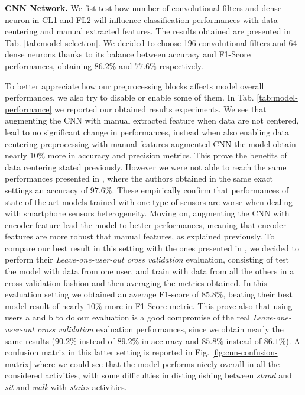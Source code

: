 \textbf{CNN Network.} We fist test how number of convolutional filters and dense neuron in CL1 and FL2 will influence classification performances with data centering and manual extracted features. The results obtained are presented in Tab. \ref{tab:model-selection}. We decided to choose 196 convolutional filters and 64 dense neurons thanks to its balance between accuracy and F1-Score performances, obtaining $86.2\%$ and $77.6\%$ respectively. 

To better appreciate how our preprocessing blocks affects model overall performances, we also try to disable or enable some of them. In Tab. \ref{tab:model-performance} we reported our obtained results experiments. We see that augmenting the CNN with manual extracted feature when data are not centered, lead to no significant change in performances, instead when also enabling data centering preprocessing with manual features augmented CNN the model obtain nearly $10\%$ more in accuracy and precision metrics. This prove the benefits of data centering stated previously. However we were not able to reach the same performances presented in \cite{ignatov2018real}, where the authors obtained in the same exact settings an accuracy of $97.6\%$. These empirically confirm that performances of state-of-the-art models trained with one type of sensors are worse when dealing with smartphone sensors heterogeneity. Moving on, augmenting the CNN with encoder feature lead the model to better performances, meaning that encoder features are more robust that manual features, as explained previously. To compare our best result in this setting with the ones presented in \cite{stisen2015smart}, we decided to perform their \textit{Leave-one-user-out cross validation} evaluation, consisting of test the model with data from one user, and train with data from all the others in a cross validation fashion and then averaging the metrics obtained. In this evaluation setting we obtained an average F1-score of $85.8\%$, beating their best model result of nearly $10\%$ more in F1-Score metric. This prove also that using users a and b to do our evaluation is a good compromise of the real \textit{Leave-one-user-out cross validation} evaluation performances, since we obtain nearly the same results ($90.2\%$ instead of $89.2\%$ in accuracy and $85.8\%$ instead of $86.1\%$). A confusion matrix in this latter setting is reported in Fig. \ref{fig:cnn-confusion-matrix} where we could see that the model performs nicely overall in all the considered activities, with some difficulties in distinguishing between \textit{stand} and \textit{sit} and \textit{walk} with \textit{stairs} activities.


